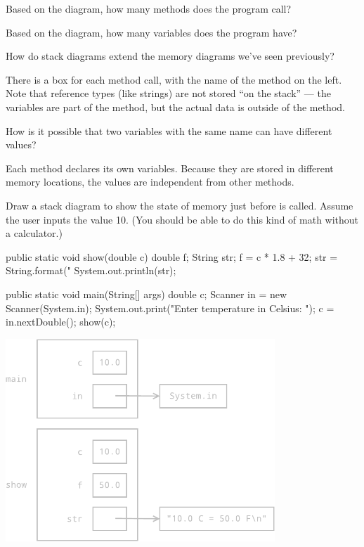 

\Q Based on the diagram, how many methods does the program call? 
\vspace{1ex}


\Q Based on the diagram, how many variables does the program have? 
\vspace{1ex}


\Q How do stack diagrams extend the memory diagrams we've seen previously?

\begin{answer}[5em]
There is a box for each method call, with the name of the method on the left.
Note that reference types (like strings) are not stored ``on the stack'' --- the variables are part of the method, but the actual data is outside of the method.
\end{answer}


\Q How is it possible that two variables with the same name can have different values?

\begin{answer}
Each method declares its own variables.
Because they are stored in different memory locations, the values are independent from other methods.
\end{answer}


\Q \label{drawing}
Draw a stack diagram to show the state of memory just before  is called.
Assume the user inputs the value 10.
(You should be able to do this kind of math without a calculator.)

\vspace{1ex}
\begin{javalst}
    public static void show(double c) {
        double f;
        String str;
        f = c * 1.8 + 32;
        str = String.format("%
        System.out.println(str);
    }

    public static void main(String[] args) {
        double c;
        Scanner in = new Scanner(System.in);
        System.out.print("Enter temperature in Celsius: ");
        c = in.nextDouble();
        show(c);
    }
\end{javalst}
\vspace{-1ex}

\begin{answer}[3in]
\vspace*{-1ex}
\hfill
\includegraphics[height=3in]{stack2.pdf}
\end{answer}


